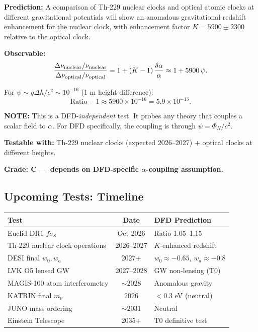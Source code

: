 \documentclass[11pt]{article}
\newcommand{\ee}[1]{\times 10^{#1}}
\begin{document}
\begin{tcolorbox}[colback=red!5!white, colframe=red!70!black,
  title=\textbf{NEW PREDICTION P29: Nuclear-Optical Clock $\psi$ Test}]

\textbf{Prediction:} A comparison of Th-229 nuclear clocks and
optical atomic clocks at different gravitational potentials will
show an anomalous gravitational redshift enhancement for the nuclear
clock, with enhancement factor $K = 5900 \pm 2300$ relative to
the optical clock.

\textbf{Observable:}
\begin{equation}
  \frac{\Delta\nu_{\rm nuclear}/\nu_{\rm nuclear}}
       {\Delta\nu_{\rm optical}/\nu_{\rm optical}}
  = 1 + (K-1)\,\frac{\delta\alpha}{\alpha}
  \approx 1 + 5900\,\psi.
\end{equation}

For $\psi \sim g\Delta h/c^2 \sim 10^{-16}$ (1 m height difference):
\begin{equation}
  \text{Ratio} - 1 \approx 5900 \times 10^{-16} = 5.9\ee{-13}.
\end{equation}

\textbf{NOTE:} This is a DFD-\emph{independent} test. It probes
any theory that couples a scalar field to $\alpha$. For DFD
specifically, the coupling is through $\psi = \Phi_N/c^2$.

\textbf{Testable with:} Th-229 nuclear clocks (expected 2026--2027)
+ optical clocks at different heights.

\textbf{Grade: C --- depends on DFD-specific $\alpha$-coupling
assumption.}

\end{tcolorbox}

\subsection{Upcoming Tests: Timeline}

\begin{center}
\begin{tabular}{lcl}
\toprule
\textbf{Test} & \textbf{Date} & \textbf{DFD Prediction} \\
\midrule
Euclid DR1 $f\sigma_8$ & Oct 2026 & Ratio 1.05--1.15 \\
Th-229 nuclear clock operations & 2026--2027 & $K$-enhanced redshift \\
DESI final $w_0, w_a$ & 2027+ & $w_0 \approx -0.65$, $w_a \approx -0.8$ \\
LVK O5 lensed GW & 2027--2028 & GW non-lensing (T0) \\
MAGIS-100 atom interferometry & $\sim 2028$ & Anomalous gravity \\
KATRIN final $m_\nu$ & 2026 & $< 0.3$ eV (neutral) \\
JUNO mass ordering & $\sim 2031$ & Neutral \\
Einstein Telescope & 2035+ & T0 definitive test \\
\bottomrule
\end{tabular}
\end{center}
\end{document}
